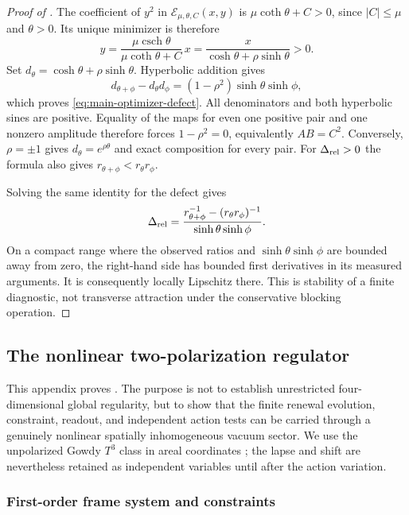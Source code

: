 \documentclass[11pt]{article}
\numberwithin{equation}{section}
\theoremstyle{definition}
\theoremstyle{remark}
\begin{document}
\begin{proof}[Proof of ]
The coefficient of $y^2$ in
$\mathcal E_{\mu,\theta,C}(x,y)$ is $\mu\coth\theta+C>0$, since
$|C|\le\mu$ and $\theta>0$.  Its unique minimizer is therefore
\[
 y=\frac{\mu\operatorname{csch}\theta}{\mu\coth\theta+C}\,x
       =\frac{x}{\cosh\theta+\rho\sinh\theta}>0.
\]
Set $d_\theta=\cosh\theta+\rho\sinh\theta$.  Hyperbolic addition gives
\[
 d_{\theta+\phi}-d_\theta d_\phi
       =(1-\rho^2)\sinh\theta\sinh\phi,
\]
which proves \eqref{eq:main-optimizer-defect}.  All denominators and both
hyperbolic sines are positive.  Equality of the maps for even one positive
pair and one nonzero amplitude therefore forces $1-\rho^2=0$, equivalently
$AB=C^2$.  Conversely, $\rho=\pm1$ gives $d_\theta=e^{\rho\theta}$ and
exact composition for every pair.  For $\Delta_{\rm rel}>0$ the formula
also gives $r_{\theta+\phi}<r_\theta r_\phi$.

Solving the same identity for the defect gives
\begin{equation}
 \Delta_{\rm rel}
 =\frac{r_{\theta+\phi}^{-1}-(r_\theta r_\phi)^{-1}}
              {\sinh\theta\sinh\phi}.
 \label{eq:supp-optimizer-defect-read}
\end{equation}
On a compact range where the observed ratios and
$\sinh\theta\sinh\phi$ are bounded away from zero, the right-hand side
has bounded first derivatives in its measured arguments.  It is consequently
locally Lipschitz there.  This is stability of a finite diagnostic, not
transverse attraction under the conservative blocking operation.
\end{proof}

\subsection{The nonlinear two-polarization regulator}
\label{supp:gowdy}

This appendix proves .  The purpose is not to
establish unrestricted four-dimensional global regularity, but to show that the
finite renewal evolution, constraint, readout, and independent action tests can
be carried through a genuinely nonlinear spatially inhomogeneous vacuum sector.
We use the unpolarized Gowdy $T^3$ class in areal coordinates
\cite{Moncrief1981}; the lapse and shift are nevertheless retained as
independent variables until after the action variation.

\subsubsection{First-order frame system and constraints}
\end{document}
